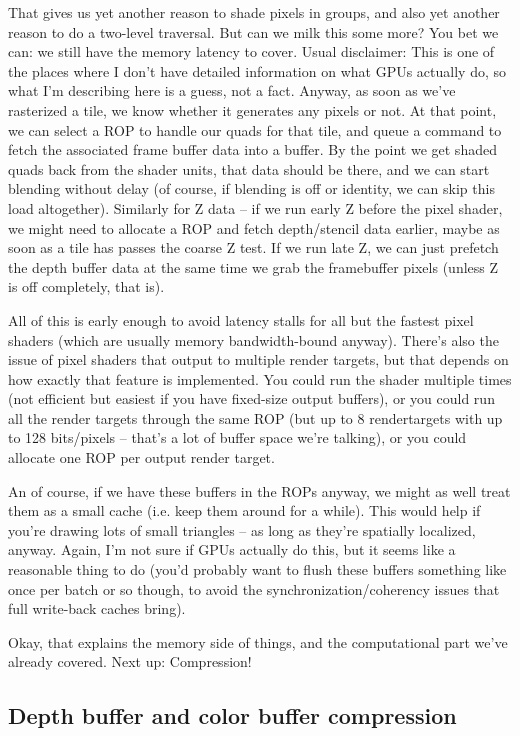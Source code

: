 \documentclass[12pt]{article}
\begin{document}
That gives us yet another reason to shade pixels in groups, and also yet another reason to do a two-level traversal. But can we milk this some more? You bet we can: we still have the memory latency to cover. Usual disclaimer: This is one of the places where I don’t have detailed information on what GPUs actually do, so what I’m describing here is a guess, not a fact. Anyway, as soon as we’ve rasterized a tile, we know whether it generates any pixels or not. At that point, we can select a ROP to handle our quads for that tile, and queue a command to fetch the associated frame buffer data into a buffer. By the point we get shaded quads back from the shader units, that data should be there, and we can start blending without delay (of course, if blending is off or identity, we can skip this load altogether). Similarly for Z data – if we run early Z before the pixel shader, we might need to allocate a ROP and fetch depth/stencil data earlier, maybe as soon as a tile has passes the coarse Z test. If we run late Z, we can just prefetch the depth buffer data at the same time we grab the framebuffer pixels (unless Z is off completely, that is).

All of this is early enough to avoid latency stalls for all but the fastest pixel shaders (which are usually memory bandwidth-bound anyway). There’s also the issue of pixel shaders that output to multiple render targets, but that depends on how exactly that feature is implemented. You could run the shader multiple times (not efficient but easiest if you have fixed-size output buffers), or you could run all the render targets through the same ROP (but up to 8 rendertargets with up to 128 bits/pixels – that’s a lot of buffer space we’re talking), or you could allocate one ROP per output render target.

An of course, if we have these buffers in the ROPs anyway, we might as well treat them as a small cache (i.e. keep them around for a while). This would help if you’re drawing lots of small triangles – as long as they’re spatially localized, anyway. Again, I’m not sure if GPUs actually do this, but it seems like a reasonable thing to do (you’d probably want to flush these buffers something like once per batch or so though, to avoid the synchronization/coherency issues that full write-back caches bring).

Okay, that explains the memory side of things, and the computational part we’ve already covered. Next up: Compression!

\subsection{Depth buffer and color buffer compression}
\label{sec:org9e6f271}
\end{document}
